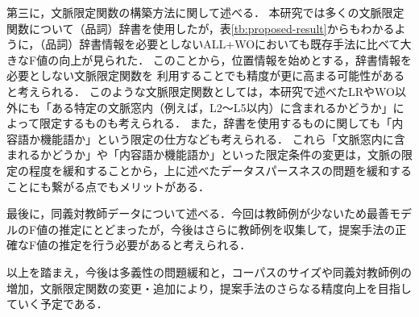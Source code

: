\documentclass[japanese]{jnlp_1.4}
\begin{document}
第三に，文脈限定関数の構築方法に関して述べる．
本研究では多くの文脈限定関数について（品詞）辞書を使用したが，表\ref{tb:proposed-result}からもわかるように，（品詞）辞書情報を必要としないALL+WOにおいても既存手法に比べて大きなF値の向上が見られた．
このことから，位置情報を始めとする，辞書情報を必要としない文脈限定関数を
利用することでも精度が更に高まる可能性があると考えられる．
このような文脈限定関数としては，本研究で述べたLRやWO以外にも「ある特定の文脈窓内（例えば，L2〜L5以内）に含まれるかどうか」によって限定するものも考えられる．
また，辞書を使用するものに関しても「内容語か機能語か」という限定の仕方なども考えられる．
これら「文脈窓内に含まれるかどうか」や「内容語か機能語か」といった限定条件の変更は，文脈の限定の程度を緩和することから，上に述べたデータスパースネスの問題を緩和することにも繋がる点でもメリットがある．

最後に，同義対教師データについて述べる．今回は教師例が少ないため最善モデルのF値の推定にとどまったが，今後はさらに教師例を収集して，提案手法の正確なF値の推定を行う必要があると考えられる．

以上を踏まえ，今後は多義性の問題緩和と，コーパスのサイズや同義対教師例の増加，文脈限定関数の変更・追加により，提案手法のさらなる精度向上を目指していく予定である．
\end{document}

